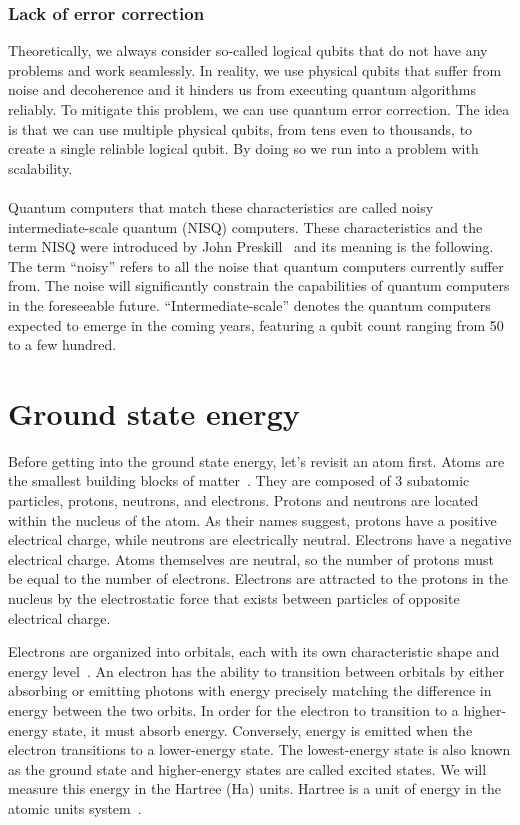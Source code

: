 \subsubsection{Lack of error correction}
Theoretically, we always consider so-called logical qubits that do not have any problems and work seamlessly. In reality, we use physical qubits that suffer from noise and decoherence and it hinders us from executing quantum algorithms reliably. To mitigate this problem, we can use quantum error correction. The idea is that we can use multiple physical qubits, from tens even to thousands, to create a single reliable logical qubit. By doing so we run into a problem with scalability. 

\paragraph{}
Quantum computers that match these characteristics are called noisy intermediate-scale quantum (NISQ) computers. These characteristics and the term NISQ were introduced by John Preskill~\cite{nisq} and its meaning is the following. The term ``noisy'' refers to all the noise that quantum computers currently suffer from. The noise will significantly constrain the capabilities of quantum computers in the foreseeable future. ``Intermediate-scale'' denotes the quantum computers expected to emerge in the coming years, featuring a qubit count ranging from 50 to a few hundred. 

\section{Ground state energy}
Before getting into the ground state energy, let's revisit an atom first. Atoms are the smallest building blocks of matter~\cite{chemistry}. They are composed of 3 subatomic particles, protons, neutrons, and electrons. Protons and neutrons are located within the nucleus of the atom. As their names suggest, protons have a positive electrical charge, while neutrons are electrically neutral. Electrons have a negative electrical charge. Atoms themselves are neutral, so the number of protons must be equal to the number of electrons. Electrons are attracted to the protons in the nucleus by the electrostatic force that exists between particles of opposite electrical charge.

Electrons are organized into orbitals, each with its own characteristic shape and energy level~\cite{chemistry}. An electron has the ability to transition between orbitals by either absorbing or emitting photons with energy precisely matching the difference in energy between the two orbits. In order for the electron to transition to a higher-energy state, it must absorb energy. Conversely, energy is emitted when the electron transitions to a lower-energy state. The lowest-energy state is also known as the ground state and higher-energy states are called excited states. We will measure this energy in the Hartree (Ha) units. Hartree is a unit of energy in the atomic units system~\cite{hartree}.

